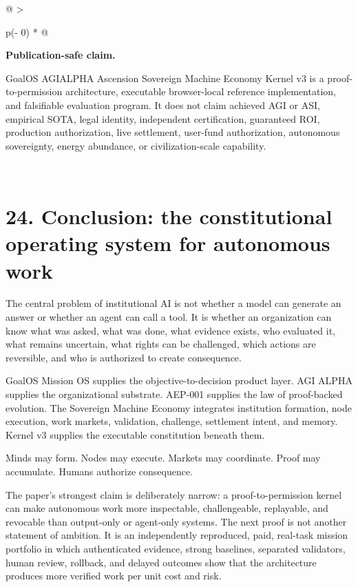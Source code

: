 \begin{longtable}[]{@{}
  >{\raggedright\arraybackslash}p{(\columnwidth - 0\tabcolsep) * }@{}}
\toprule\noalign{}
\begin{minipage}[b]{\linewidth}\raggedright
\textbf{Publication-safe claim.}

GoalOS AGIALPHA Ascension Sovereign Machine Economy Kernel v3 is a
proof-to-permission architecture, executable browser-local reference
implementation, and falsifiable evaluation program. It does not claim
achieved AGI or ASI, empirical SOTA, legal identity, independent
certification, guaranteed ROI, production authorization, live
settlement, user-fund authorization, autonomous sovereignty, energy
abundance, or civilization-scale capability.
\end{minipage} \\
\midrule\noalign{}
\endhead
\bottomrule\noalign{}
\endlastfoot
\end{longtable}

\section{24. Conclusion: the constitutional operating system for
autonomous
work}\label{conclusion-the-constitutional-operating-system-for-autonomous-work}

The central problem of institutional AI is not whether a model can
generate an answer or whether an agent can call a tool. It is whether an
organization can know what was asked, what was done, what evidence
exists, who evaluated it, what remains uncertain, what rights can be
challenged, which actions are reversible, and who is authorized to
create consequence.

GoalOS Mission OS supplies the objective-to-decision product layer. AGI
ALPHA supplies the organizational substrate. AEP-001 supplies the law of
proof-backed evolution. The Sovereign Machine Economy integrates
institution formation, node execution, work markets, validation,
challenge, settlement intent, and memory. Kernel v3 supplies the
executable constitution beneath them.

Minds may form. Nodes may execute. Markets may coordinate. Proof may
accumulate. Humans authorize consequence.

The paper's strongest claim is deliberately narrow: a
proof-to-permission kernel can make autonomous work more inspectable,
challengeable, replayable, and revocable than output-only or agent-only
systems. The next proof is not another statement of ambition. It is an
independently reproduced, paid, real-task mission portfolio in which
authenticated evidence, strong baselines, separated validators, human
review, rollback, and delayed outcomes show that the architecture
produces more verified work per unit cost and risk.


